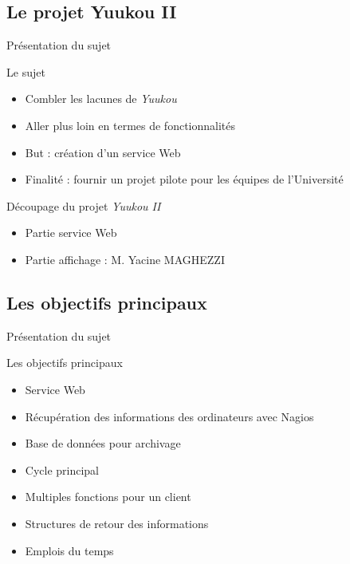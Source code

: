 
\subsection{Le projet Yuukou II}

\begin{frame}{Pr\'esentation du sujet}
	\begin{block}{Le sujet}
		\begin{itemize}
			\item Combler les lacunes de \textit{Yuukou}
			\item Aller plus loin en termes de fonctionnalit\'es
			\item But : cr\'eation d'un service Web
			\item Finalit\'e : fournir un projet pilote pour les \'equipes de l'Universit\'e
			
		\end{itemize}
		
	\end{block}
	
	\begin{block}{D\'ecoupage du projet \textit{Yuukou II}}
		\begin{itemize}
			\item Partie service Web
			\item Partie affichage : M. Yacine MAGHEZZI
			
		\end{itemize}
		
	\end{block}
	
\end{frame}


\subsection{Les objectifs principaux}

\begin{frame}{Pr\'esentation du sujet}
	\begin{block}{Les objectifs principaux}
		\begin{itemize}
			\item Service Web
			\item R\'ecup\'eration des informations des ordinateurs avec Nagios
			\item Base de donn\'ees pour archivage
			\item Cycle principal
			\item Multiples fonctions pour un client
			\item Structures de retour des informations
			\item Emplois du temps
			
		\end{itemize}
		
	\end{block}
	
\end{frame}

